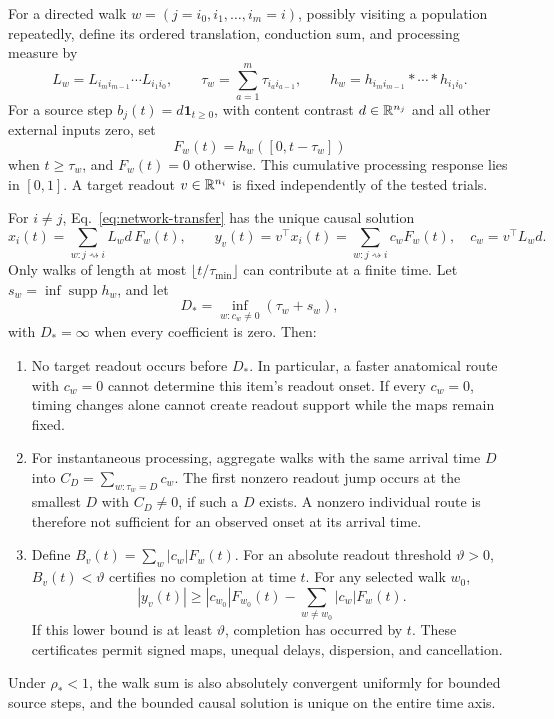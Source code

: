 For a directed walk $w=(j=i_0,i_1,\ldots,i_m=i)$, possibly visiting a population repeatedly, define its ordered translation, conduction sum, and processing measure by
\[
 L_w=L_{i_m i_{m-1}}\cdots L_{i_1i_0},\qquad
 \tau_w=\sum_{a=1}^m\tau_{i_ai_{a-1}},\qquad
 h_w=h_{i_mi_{m-1}}*\cdots*h_{i_1i_0}.
\]
For a source step $b_j(t)=d\mathbf1_{t\ge0}$, with content contrast $d\in\mathbb R^{n_j}$ and all other external inputs zero, set
\[
 F_w(t)=h_w([0,t-\tau_w])
\]
when $t\ge\tau_w$, and $F_w(t)=0$ otherwise. This cumulative processing response lies in $[0,1]$. A target readout $v\in\mathbb R^{n_i}$ is fixed independently of the tested trials.

\begin{theorem}\label{thm:network}
For $i\ne j$, Eq.~\eqref{eq:network-transfer} has the unique causal solution
\begin{equation}
x_i(t)=\sum_{w:j\rightsquigarrow i}L_wd\,F_w(t),\qquad
 y_v(t)=v^\top x_i(t)=\sum_{w:j\rightsquigarrow i}c_wF_w(t),\quad c_w=v^\top L_wd.
\label{eq:walk-response}
\end{equation}
Only walks of length at most $\lfloor t/\tau_{\min}\rfloor$ can contribute at a finite time. Let $s_w=\inf\operatorname{supp}h_w$, and let
\[
 D_* =\inf_{w:c_w\ne0}(\tau_w+s_w),
\]
with $D_*=\infty$ when every coefficient is zero. Then:
\begin{enumerate}[label=(\roman*),leftmargin=*]
\item No target readout occurs before $D_*$. In particular, a faster anatomical route with $c_w=0$ cannot determine this item's readout onset. If every $c_w=0$, timing changes alone cannot create readout support while the maps remain fixed.
\item For instantaneous processing, aggregate walks with the same arrival time $D$ into $C_D=\sum_{w:\tau_w=D}c_w$. The first nonzero readout jump occurs at the smallest $D$ with $C_D\ne0$, if such a $D$ exists. A nonzero individual route is therefore not sufficient for an observed onset at its arrival time.
\item Define $B_v(t)=\sum_w|c_w|F_w(t)$. For an absolute readout threshold $\vartheta>0$, $B_v(t)<\vartheta$ certifies no completion at time $t$. For any selected walk $w_0$,
\[
 |y_v(t)|\ge |c_{w_0}|F_{w_0}(t)-\sum_{w\ne w_0}|c_w|F_w(t).
\]
If this lower bound is at least $\vartheta$, completion has occurred by $t$. These certificates permit signed maps, unequal delays, dispersion, and cancellation.
\end{enumerate}
Under $\rho_*<1$, the walk sum is also absolutely convergent uniformly for bounded source steps, and the bounded causal solution is unique on the entire time axis.
\end{theorem}
